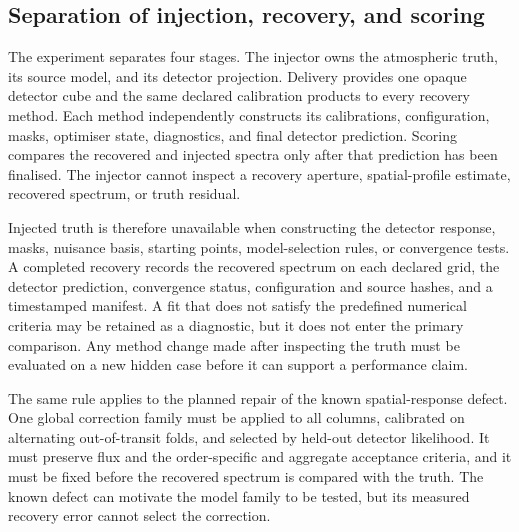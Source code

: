 \subsection{Separation of injection, recovery, and scoring}

The experiment separates four stages. The injector owns the atmospheric
truth, its source model, and its detector projection. Delivery provides one
opaque detector cube and the same declared calibration products to every
recovery method. Each method independently constructs its calibrations,
configuration, masks, optimiser state, diagnostics, and final detector
prediction. Scoring compares the recovered and injected spectra only after
that prediction has been finalised. The injector cannot inspect a recovery
aperture, spatial-profile estimate, recovered spectrum, or truth residual.

Injected truth is therefore unavailable when constructing the detector
response, masks, nuisance basis, starting points, model-selection rules, or
convergence tests. A completed recovery records the recovered spectrum on each
declared grid, the detector prediction, convergence status, configuration and
source hashes, and a timestamped manifest. A fit that does not satisfy the
predefined numerical criteria may be retained as a diagnostic, but it does not
enter the primary comparison. Any method change made after inspecting the
truth must be evaluated on a new hidden case before it can support a performance
claim.

The same rule applies to the planned repair of the known spatial-response
defect. One global correction family must be applied to all columns, calibrated
on alternating out-of-transit folds, and selected by held-out detector
likelihood. It must preserve flux and the order-specific and aggregate
acceptance criteria, and it must be fixed before the recovered spectrum is
compared with the truth. The known defect can motivate the model family to be
tested, but its measured recovery error cannot select the correction.

